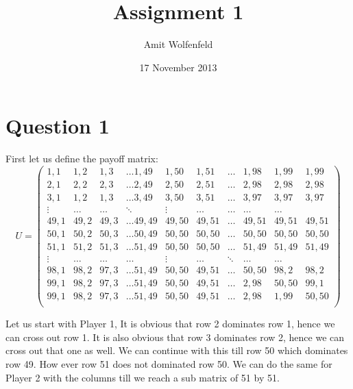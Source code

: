 \documentclass{article}
\title{Assignment 1}
\author{Amit Wolfenfeld}
\date{17 November 2013}
\begin{document}
\maketitle

\section*{Question 1}
First let us define the payoff matrix:
\\

$$ U = \begin{pmatrix}

1,1	& 1,2 & 1,3  & \dots 1,49 & 1,50 & 1,51  & \dots   &  1,98	& 1,99 & 1,99  \\

2,1	& 2,2 & 2,3  & \dots 2,49 & 2,50 & 2,51  & \dots   &  2,98	& 2,98 & 2,98  \\

3,1	& 1,2 & 1,3  & \dots 3,49 & 3,50 & 3,51  & \dots   &  3,97	& 3,97 & 3,97  \\

\vdots  & \dots & \dots & \ddots & \vdots & \dots & \dots & \dots & \dots \\

49,1	& 49,2 & 49,3  & \dots 49,49 & 49,50 & 49,51  & \dots   &  49,51	& 49,51 &
49,51
\\

50,1	& 50,2 & 50,3  & \dots 50,49 & 50,50 & 50,50  & \dots   &  50,50	& 50,50 &
50,50
\\

51,1	& 51,2 & 51,3  & \dots 51,49 & 50,50 & 50,50  & \dots   &  51,49	& 51,49 &
51,49
\\

\vdots  & \dots & \dots & \dots & \vdots & \dots & \ddots & \dots & \dots \\

98,1	& 98,2 & 97,3  & \dots 51,49 & 50,50 & 49,51  & \dots    & 50,50	& 98,2 &
98,2
\\

99,1	& 98,2 & 97,3  & \dots 51,49 & 50,50 & 49,51  & \dots   & 2,98	& 50,50 &
99,1
\\

99,1	& 98,2 & 97,3  & \dots 51,49 & 50,50 & 49,51  & \dots   &  2,98	& 1,99 &
50,50
\\

\end{pmatrix}
$$ 

Let us start with Player 1, It is obvious that row 2 dominates row 1, hence we
can cross out row 1. It is also obvious that row 3 dominates row 2, hence we can
cross out that one as well. We can continue with this till row 50 which
dominates row 49. How ever row 51 does not dominated row 50.
We can do the same for Player 2 with the columns till we reach a sub matrix of
51 by 51.\\
\end{document}
